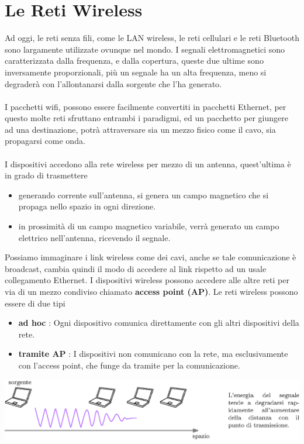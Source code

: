 \documentclass[12pt, letterpaper]{article}
\newcommand{\acc}{\\\hphantom{}\\}
\begin{document}
\section{Le Reti Wireless}
Ad oggi, le reti senza fili, come le LAN wireless, le reti cellulari e le reti Bluetooth sono largamente 
utilizzate ovunque nel mondo. I segnali elettromagnetici sono caratterizzata dalla frequenza, e dalla copertura, 
queste due ultime sono inversamente proporzionali, più un segnale ha un alta frequenza, meno si degraderà con 
l'allontanarsi dalla sorgente che l'ha generato. \acc 
I pacchetti wifi, possono essere facilmente convertiti in pacchetti Ethernet, per questo molte reti sfruttano entrambi i 
paradigmi, ed un pacchetto per giungere ad una destinazione, potrà attraversare sia un mezzo fisico come il cavo, sia 
propagarsi come onda.\acc 
I dispositivi accedono alla rete wireless per mezzo di un antenna, quest'ultima è in grado di trasmettere\begin{itemize}
    \item generando corrente sull'antenna, si genera un campo magnetico che si propaga nello spazio in ogni 
    direzione. 
    \item in prossimità di un campo magnetico variabile, verrà generato un campo elettrico nell'antenna, ricevendo il segnale.
\end{itemize}
Possiamo immaginare i link wireless come dei cavi, anche se tale comunicazione è broadcast, cambia quindi il modo di 
accedere al link rispetto ad un usale collegamento Ethernet. I dispositivi wireless possono accedere alle altre reti 
per via di un mezzo condiviso chiamato \textbf{access point (AP)}. Le reti wireless possono essere di due tipi\begin{itemize}
    \item \textbf{ad hoc} : Ogni dispositivo comunica direttamente con gli altri dispositivi della rete. 
    \item \textbf{tramite AP} : I dispositivi non comunicano con la rete, ma esclusivamente con l'access point, 
    che funge da tramite per la comunicazione.
\end{itemize}\begin{center}
    \includegraphics[width=1\textwidth ]{images/degradazioneSegnale.eps}
\end{center}
\end{document}

